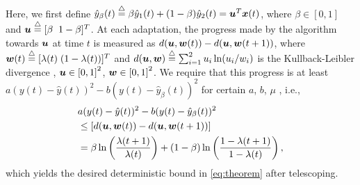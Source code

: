 \documentclass[journal]{IEEEtran}
\newcommand{\nn}{\nonumber}
\renewcommand{\vec}[1]{\mbox{\boldmath${#1}$}}
\newcommand{\vu}{\vec{u}}
\newcommand{\vw}{\vec{w}}
\newcommand{\vx}{\mbox{$\vec{x}$}}
\newcommand{\defi}{\stackrel{\bigtriangleup}{=}}
\begin{document}
Here, we first define $\hat{y}_{\beta}(t)\defi\beta \hat{y}_1(t)+(1-\beta)\hat{y}_2(t)=\vu^T \vx(t)$, where $\beta\in[0,1]$ and $\vu \defi [\beta\;\;1-\beta]^T$.  At each
adaptation, the progress made by the algorithm towards $\vu$ at time
$t$ is measured as $d(\vu,\vw(t)) - d(\vu,\vw(t+1))$, where $\vw(t)
\defi [\lambda(t) \; (1-\lambda(t))]^T$ and $d(\vu,\vw) \defi
\sum_{i=1}^2 u_i \ln (u_i/w_i)$ is the
Kullback-Leibler divergence \cite{cesab}, $\vu \in \left[0,1\right]^2$, $\vw \in \left[0,1\right]^2$. We require that this
progress is at least $a(y(t)-\hat{y}(t))^2 - b(y(t)-\hat{y}_{\beta}(t))^2$
for certain $a$, $b$, $\mu$ \cite{cesab,KiWa02}, i.e.,
\begin{align}
&a(y(t)-\hat{y}(t))^2 - b(y(t)-\hat{y}_{\beta}(t))^2 \nn\\ &\leq [d(\vu,\vw(t)) - d(\vu,\vw(t+1))] \nn\\
&= \beta \ln\left(\frac{\lambda(t+1)}{\lambda(t)}\right)+(1-\beta) \ln\left(\frac{1-\lambda(t+1)}{1-\lambda(t)}\right),
\label{desired_bound}
\end{align}
which yields the desired deterministic bound in \eqref{eq:theorem}
after telescoping.
\end{document}
